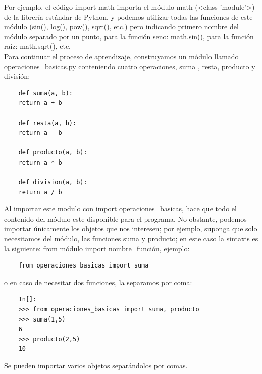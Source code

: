 Por ejemplo, el código {\ttfamily import math} importa el módulo {\ttfamily math} ({\ttfamily<{}class {}'{}module{}'{}>{}}) de la librería estándar de Python, y podemos utilizar todas las funciones de este módulo ({\ttfamily sin()}, { \ttfamily log()}, { \ttfamily pow()},  { \ttfamily sqrt()},  etc.) pero indicando primero nombre del módulo separado por un punto, para la función seno: {\ttfamily math.sin()},  para la función raíz: {\ttfamily math.sqrt()}, etc. \\  

Para continuar el proceso de aprendizaje, construyamos un módulo llamado {\ttfamily operaciones\_basicas.py}   conteniendo cuatro operaciones, suma , resta, producto y división:

\hspace{-2.9cm}{\ttfamily \scriptsize operaciones}

\vspace{-0.2cm}
\hspace{-2.5cm}{\ttfamily \scriptsize \_basicas.py}\vspace{-0.84cm}
\begin{lstlisting}
	def suma(a, b):
	return a + b
	
	def resta(a, b):
	return a - b
	
	def producto(a, b):
	return a * b
	
	def division(a, b):
	return a / b 
\end{lstlisting}

Al importar este modulo con {\ttfamily import operaciones\_basicas}, hace que todo el contenido del módulo este disponible para el programa. No obstante, podemos importar únicamente los objetos que nos interesen; por ejemplo, suponga que solo necesitamos del módulo, las funciones suma y producto; en este caso la sintaxis es la siguiente: {\ttfamily from módulo import nombre\_función}, ejemplo:

\begin{lstlisting}
	from operaciones_basicas import suma 
\end{lstlisting}

o en caso de necesitar dos funciones, la separamos por coma:

\begin{lstlisting}
	In[]:
	>>> from operaciones_basicas import suma, producto 
	>>> suma(1,5)
	6
	>>> producto(2,5)
	10
\end{lstlisting}

Se pueden importar varios objetos separándolos por comas.\\

